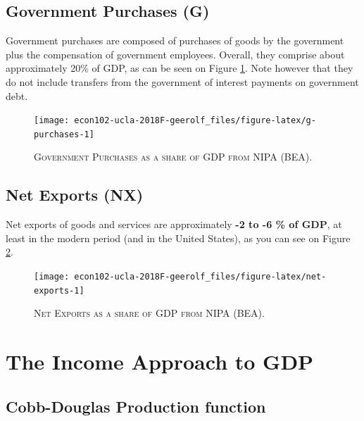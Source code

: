 \documentclass[]{book}
\theoremstyle{definition}
\theoremstyle{definition}
\theoremstyle{definition}
\theoremstyle{remark}
\begin{document}
\subsection{Government Purchases (G)}\label{gov}

Government purchases are composed of purchases of goods by the
government plus the compensation of government employees. Overall, they
comprise about approximately 20\% of GDP, as can be seen on Figure
\ref{fig:g-purchases}. Note however that they do not include transfers
from the government of interest payments on government debt.




\begin{figure}

{\centering \texttt{[image: econ102-ucla-2018F-geerolf\_files/figure-latex/g-purchases-1]} 

}

\caption{\textsc{Government Purchases as a share of GDP
from NIPA (BEA)}.}\label{fig:g-purchases}
\end{figure}

\subsection{Net Exports (NX)}\label{net-exports}

Net exports of goods and services are approximately \textbf{-2 to -6 \%
of GDP}, at least in the modern period (and in the United States), as
you can see on Figure \ref{fig:net-exports}.




\begin{figure}

{\centering \texttt{[image: econ102-ucla-2018F-geerolf\_files/figure-latex/net-exports-1]} 

}

\caption{\textsc{Net Exports as a share of GDP from NIPA
(BEA)}.}\label{fig:net-exports}
\end{figure}

\section{The Income Approach to GDP}\label{gdp-income}

\subsection{Cobb-Douglas Production
function}\label{cobb-douglas-production-function}
\end{document}
